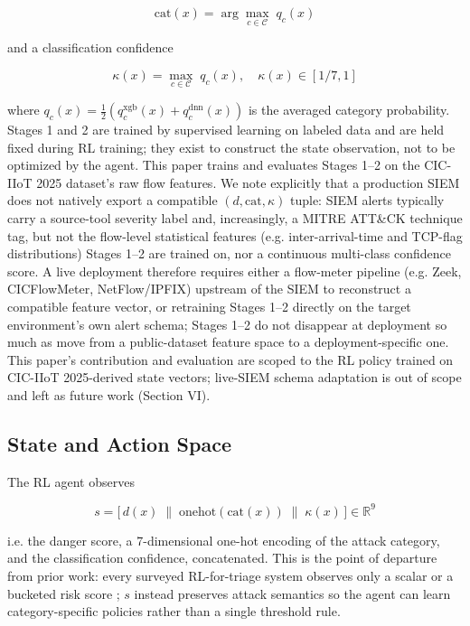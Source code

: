 \documentclass[conference]{IEEEtran}
\newcommand{\categ}{\text{cat}}
\newcommand{\danger}{d}
\newcommand{\conf}{\kappa}
\begin{document}
\begin{equation}
\categ(x) = \arg\max_{c \in \mathcal{C}} \; q_c(x)
\end{equation}

and a classification confidence

\begin{equation}
\conf(x) = \max_{c \in \mathcal{C}} \; q_c(x), \quad \conf(x) \in [1/7, 1]
\end{equation}

where $q_c(x) = \tfrac{1}{2}(q_c^{\text{xgb}}(x) + q_c^{\text{dnn}}(x))$ is the averaged category probability. Stages 1 and 2 are trained by supervised learning on labeled data and are held fixed during RL training; they exist to construct the state observation, not to be optimized by the agent. This paper trains and evaluates Stages 1--2 on the CIC-IIoT 2025 dataset's raw flow features. We note explicitly that a production SIEM does not natively export a compatible $(\danger, \categ, \conf)$ tuple: SIEM alerts typically carry a source-tool severity label and, increasingly, a MITRE ATT\&CK technique tag, but not the flow-level statistical features (e.g. inter-arrival-time and TCP-flag distributions) Stages 1--2 are trained on, nor a continuous multi-class confidence score. A live deployment therefore requires either a flow-meter pipeline (e.g. Zeek, CICFlowMeter, NetFlow/IPFIX) upstream of the SIEM to reconstruct a compatible feature vector, or retraining Stages 1--2 directly on the target environment's own alert schema; Stages 1--2 do not disappear at deployment so much as move from a public-dataset feature space to a deployment-specific one. This paper's contribution and evaluation are scoped to the RL policy trained on CIC-IIoT 2025-derived state vectors; live-SIEM schema adaptation is out of scope and left as future work (Section VI).

\subsection{State and Action Space}

The RL agent observes

\begin{equation}
s = \big[\, \danger(x) \;\big\|\; \text{onehot}(\categ(x)) \;\big\|\; \conf(x) \,\big] \in \mathbb{R}^{9}
\end{equation}

i.e. the danger score, a 7-dimensional one-hot encoding of the attack category, and the classification confidence, concatenated. This is the point of departure from prior work: every surveyed RL-for-triage system observes only a scalar or a bucketed risk score \cite{chavali2022,chavali2024,knap2024,alertpro2024}; $s$ instead preserves attack semantics so the agent can learn category-specific policies rather than a single threshold rule.
\end{document}
